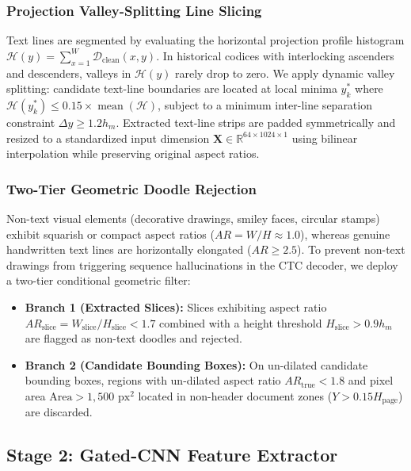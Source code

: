 \documentclass{IEEEtran}
\begin{document}
\subsubsection{Projection Valley-Splitting Line Slicing}

Text lines are segmented by evaluating the horizontal projection profile histogram $\mathcal{H}(y) = \sum_{x=1}^{W} \mathcal{D}_{\text{clean}}(x, y)$. In historical codices with interlocking ascenders and descenders, valleys in $\mathcal{H}(y)$ rarely drop to zero. We apply dynamic valley splitting: candidate text-line boundaries are located at local minima $y_k^*$ where $\mathcal{H}(y_k^*) \le 0.15 \times \operatorname{mean}(\mathcal{H})$, subject to a minimum inter-line separation constraint $\Delta y \ge 1.2 h_m$. Extracted text-line strips are padded symmetrically and resized to a standardized input dimension $\mathbf{X} \in \mathbb{R}^{64 \times 1024 \times 1}$ using bilinear interpolation while preserving original aspect ratios.

\subsubsection{Two-Tier Geometric Doodle Rejection}

Non-text visual elements (decorative drawings, smiley faces, circular stamps) exhibit squarish or compact aspect ratios ($AR = W/H \approx 1.0$), whereas genuine handwritten text lines are horizontally elongated ($AR \ge 2.5$). To prevent non-text drawings from triggering sequence hallucinations in the CTC decoder, we deploy a two-tier conditional geometric filter:

\begin{itemize}

    \item \textbf{Branch 1 (Extracted Slices):} Slices exhibiting aspect ratio $AR_{\text{slice}} = W_{\text{slice}} / H_{\text{slice}} < 1.7$ combined with a height threshold $H_{\text{slice}} > 0.9 h_m$ are flagged as non-text doodles and rejected.

    \item \textbf{Branch 2 (Candidate Bounding Boxes):} On un-dilated candidate bounding boxes, regions with un-dilated aspect ratio $AR_{\text{true}} < 1.8$ and pixel area $\text{Area} > 1,500\text{ px}^2$ located in non-header document zones ($Y > 0.15 H_{\text{page}}$) are discarded.

\end{itemize}

\subsection{Stage 2: Gated-CNN Feature Extractor}
\end{document}
